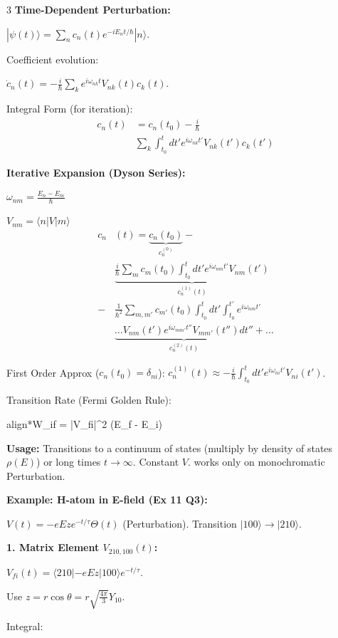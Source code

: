 \documentclass[10pt,a4paper]{article}
\newcommand{\important}[1]{\begin{empheq}[box=\fbox]{align*}#1\end{empheq}}
\begin{document}
\begin{multicols*}{3}
\textbf{Time-Dependent Perturbation:}

$|\psi(t)\rangle = \sum_n c_n(t) e^{-i E_n t/\hbar} |n\rangle$.

Coefficient evolution:

$\dot{c}_n(t) = -\frac{i}{\hbar} \sum_k e^{i\omega_{nk}t} V_{nk}(t) c_k(t)$.

Integral Form (for iteration):
\begin{align*}
c_n(t) &= c_n(t_0) - \frac{i}{\hbar} \\ &\sum_k \int_{t_0}^t dt' e^{i\omega_{nk}t'} V_{nk}(t') c_k(t')
\end{align*}

\textbf{Iterative Expansion (Dyson Series):}

$\omega_{nm}=\frac{E_n-E_m}{\hbar}$

$V_{nm}=\langle n|V|m\rangle$
\begin{align*}
c_n&(t) = \underbrace{c_n(t_0)}_{c_n^{(0)}} - \\ &\underbrace{\frac{i}{\hbar} \sum_m c_m(t_0) \int_{t_0}^t dt' e^{i\omega_{nm}t'} V_{nm}(t')}_{c_n^{(1)}(t)} \\
- &\frac{1}{\hbar^2} \sum_{m,m'} c_{m'}(t_0) \int_{t_0}^t dt' \int_{t_0}^{t'}  e^{i\omega_{nm}t'} \\ & \underbrace{\dots V_{nm}(t') e^{i\omega_{mm'}t''} V_{mm'}(t'')dt''}_{c_n^{(2)}(t)} + \dots
\end{align*}

First Order Approx ($c_n(t_0)=\delta_{ni}$):
$c_n^{(1)}(t) \approx -\frac{i}{\hbar} \int_{t_0}^t dt' e^{i\omega_{ni}t'} V_{ni}(t')$.

Transition Rate (Fermi Golden Rule): 
\important{W_{i\to f} = \frac{2\pi}{\hbar} |V_{fi}|^2 \delta(E_f - E_i)}

\textbf{Usage:} Transitions to a continuum of states (multiply by density of states $\rho(E)$) or long times $t \to \infty$. Constant $V$.
works only on monochromatic Perturbation.

\textbf{Example: H-atom in E-field (Ex 11 Q3):}

$V(t) = -eEz e^{-t/\tau} \Theta(t)$ (Perturbation). Transition $|100\rangle \to |210\rangle$.

\textbf{1. Matrix Element $V_{210, 100}(t)$:}

$V_{fi}(t) = \langle 210 | -eEz | 100 \rangle e^{-t/\tau}$. 

Use $z = r\cos\theta = r\sqrt{\frac{4\pi}{3}}Y_{10}$.

Integral:


\end{multicols*}
\end{document}
